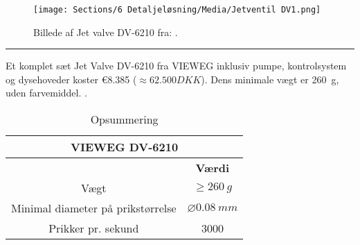 \begin{figure}[H]
    \centering
    \texttt{[image: Sections/6 Detaljeløsning/Media/Jetventil DV1.png]}
    \caption{Billede af Jet valve DV-6210 fra: \parencite{VIEWEG2025JetDV-6210}.}
    \label{fig:Jetventil}
\end{figure}
\plainbreak{-0.5}


Et komplet sæt Jet Valve DV-6210 fra VIEWEG inklusiv pumpe, kontrolsystem og dysehoveder koster €8.385 ($\approx 62.500 DKK$). Dens minimale vægt er \SI{260}{g}, uden farvemiddel. \parencite{VIEWEG2025JetDV-6210}. 


\renewcommand{\arraystretch}{1.3}
\begin{table}[H]
\setlength{\tabcolsep}{20pt}
 \centering
  \caption{Opsummering}
 \begin{tabular}{|c c|} \hline
 \multicolumn{2}{|c|}{\cellcolor{aaublue} \color{white} \textbf{VIEWEG DV-6210}}  \\\hline
 \rowcolor{gray!10} \multicolumn{1}{|c}{\textbf{Variabel}} &  \multicolumn{1}{c|}{\textbf{Værdi}}  \\\hline
 
 Vægt &  $\geq \SI{260}{g} $\\\hline
 Minimal diameter på prikstørrelse &  $\diameter\SI{0,08}{mm}$\\\hline
 Prikker pr. sekund &  3000 \\\hline
 \end{tabular}
 \label{tab: PeJV opsummering}
\end{table}

